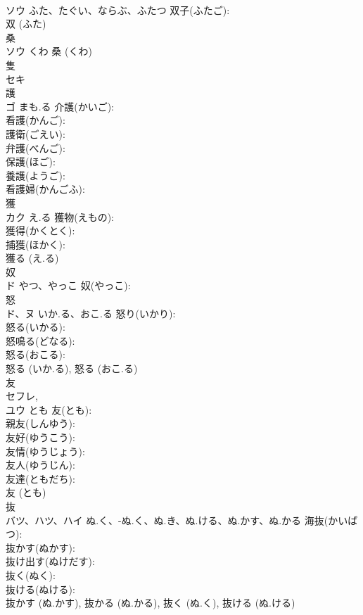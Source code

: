 \documentclass[8pt]{extreport}
\begin{document}
\begin{CJK}{UTF8}{min}
\\	ソウ	ふた、たぐい、ならぶ、ふたつ	双子(ふたご): 
\\	双 (ふた)
\\	桑			
\\	ソウ	くわ		桑 (くわ)
\\	隻			
\\	セキ			
\\	護			
\\	ゴ	まも.る	介護(かいご): 
\\	看護(かんご): 
\\	護衛(ごえい): 
\\	弁護(べんご): 
\\	保護(ほご): 
\\	養護(ようご): 
\\	看護婦(かんごふ): 
\\	獲			
\\	カク	え.る	獲物(えもの): 
\\	獲得(かくとく): 
\\	捕獲(ほかく): 
\\	獲る (え.る)
\\	奴			
\\	ド	やつ、やっこ	奴(やっこ): 
\\	怒			
\\	ド、ヌ	いか.る、おこ.る	怒り(いかり): 
\\	怒る(いかる): 
\\	怒鳴る(どなる): 
\\	怒る(おこる): 
\\	怒る (いか.る), 怒る (おこ.る)
\\	友			
\\	セフレ, 
\\	ユウ	とも	友(とも): 
\\	親友(しんゆう): 
\\	友好(ゆうこう): 
\\	友情(ゆうじょう): 
\\	友人(ゆうじん): 
\\	友達(ともだち): 
\\	友 (とも)
\\	抜			
\\	バツ、ハツ、ハイ	ぬ.く、-ぬ.く、ぬ.き、ぬ.ける、ぬ.かす、ぬ.かる	海抜(かいばつ): 
\\	抜かす(ぬかす): 
\\	抜け出す(ぬけだす): 
\\	抜く(ぬく): 
\\	抜ける(ぬける): 
\\	抜かす (ぬ.かす), 抜かる (ぬ.かる), 抜く (ぬ.く), 抜ける (ぬ.ける)

\end{CJK}
\end{document}
